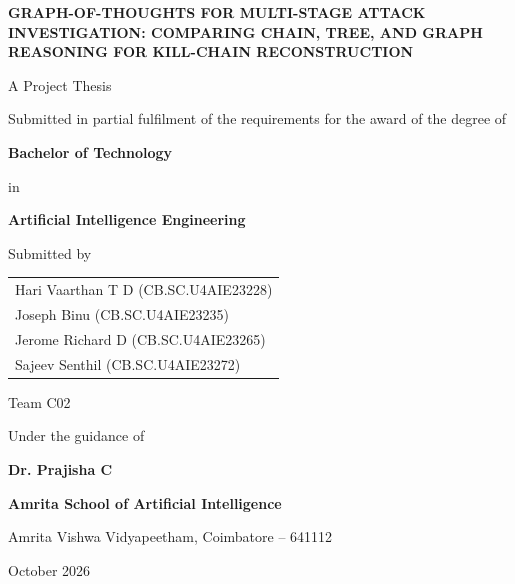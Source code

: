 \begin{titlepage}
\begin{center}
\vspace*{0.4in}
{\Large\bfseries GRAPH-OF-THOUGHTS FOR MULTI-STAGE ATTACK INVESTIGATION: COMPARING CHAIN, TREE, AND GRAPH REASONING FOR KILL-CHAIN RECONSTRUCTION\par}

\vspace{0.5in}
{\large A Project Thesis\par}
\vspace{0.15in}
{\normalsize Submitted in partial fulfilment of the requirements for the award of the degree of\par}
\vspace{0.15in}
{\large\bfseries Bachelor of Technology\par}
{\normalsize in\par}
{\large\bfseries Artificial Intelligence Engineering\par}

\vspace{0.45in}
{\normalsize Submitted by\par}
\vspace{0.1in}
\begin{tabular}{l}
Hari Vaarthan T D \quad (CB.SC.U4AIE23228) \\
Joseph Binu \quad (CB.SC.U4AIE23235) \\
Jerome Richard D \quad (CB.SC.U4AIE23265) \\
Sajeev Senthil \quad (CB.SC.U4AIE23272) \\
\end{tabular}

\vspace{0.15in}
{\normalsize Team C02\par}

\vspace{0.4in}
{\normalsize Under the guidance of\par}
\vspace{0.05in}
{\large\bfseries Dr. Prajisha C\par}

\vfill
{\large\bfseries Amrita School of Artificial Intelligence\par}
{\normalsize Amrita Vishwa Vidyapeetham, Coimbatore -- 641112\par}
\vspace{0.1in}
{\normalsize October 2026\par}
\end{center}
\end{titlepage}
